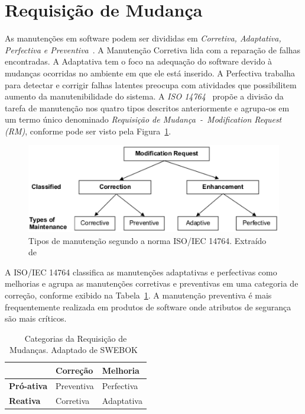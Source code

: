 \section{Requisição de Mudança}
\label{sec:requisição_de_mudanca}
As manutenções em software podem ser divididas em \textit{Corretiva,
	Adaptativa, Perfectiva e Preventiva}~\cite{Lientz:1980:SMM:601062,159342}.
A Manutenção Corretiva lida com a reparação de falhas encontradas. A Adaptativa
tem o foco na adequação do software devido à mudanças ocorridas no ambiente
em que ele está inserido. A Perfectiva trabalha para detectar e corrigir falhas
latentes preocupa com atividades que possibilitem aumento da manutenibilidade
do sistema.  A \textit{ISO 14764}~\cite{1703974} propõe a divisão da tarefa de
manutenção nos quatro tipos descritos anteriormente e agrupa-os em um termo
único denominado \textit{{Requisição de Mudança~-~Modification Request (RM)}},
conforme pode ser visto pela Figura~\ref{fig:modification-request}.

\begin{figure}[hbtp]
\centering
\includegraphics[width=.75\textwidth]{chapter-intro/img/modification_request.eps}
\caption{Tipos de manutenção segundo a norma ISO/IEC 14764. Extraído de~\cite{1703974}}
\label{fig:modification-request}
\end{figure}

A ISO/IEC 14764 classifica as manutenções adaptativas e perfectivas como melhorias e agrupa as
manutenções corretivas e preventivas em uma categoria de correção, conforme exibido na
Tabela~\ref{tab:categorias_requisicao_mudanca}. A manutenção preventiva é mais frequentemente
realizada em produtos de software onde atributos de segurança são mais críticos.

\begin{table}[htpb]

	\centering
	\caption{Categorias da Requisição de Mudanças. Adaptado de SWEBOK~\cite{4425813}}\label{tab:categorias_requisicao_mudanca}
	\begin{tabular}{l|l|l|}
		\cline{2-3}
	 & \textbf{Correção} & \textbf{Melhoria} \\ \hline
	 \multicolumn{1}{|l|}{\textbf{Pró-ativa}} & Preventiva & Perfectiva \\ \hline
	 \multicolumn{1}{|l|}{\textbf{Reativa}} & Corretiva & Adaptativa \\ \hline
	\end{tabular}
 \end{table} 

